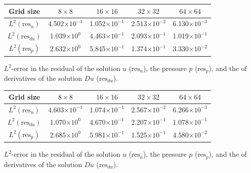 \documentclass[usenames,dvipsnames,letterpaper,landscape,final]{slides}
\theoremstyle{definition}
\begin{document}
\begin{myslide}

\begin{center}
     \begin{tabular}{c | c c c c}
     Grid size & $8\times8$ & $16\times 16$ & $32\times32$ & $64 \times 64$ \\
     \hline
     $L^2(\text{res}_u)$ & 4.502$\times10^{-1}$ & 1.052$\times10^{-1}$ & 2.513$\times10^{-2}$ & 6.130$\times10^{-3}$ \\
				 $L^2(\text{res}_{du})$ & 1.039$\times10^0$ & 4.463$\times10^{-1}$ & 2.093$\times10^{-1}$ & 1.019$\times10^{-1}$ \\
     $L^2(\text{res}_{p})$ & 2.632$\times10^0$ & 5.845$\times10^{-1}$ & 1.374$\times10^{-1}$ & 3.330$\times10^{-2}$ \\
    \end{tabular}
\end{center}

     $L^2$-error in the residual of the solution $u$ ($\text{res}_u$), the pressure $p$ ($\text{res}_p$), and the of derivatives of the solution $Du$ ($\text{res}_{du}$).

\vspace{0.8cm}
\begin{center}
    \begin{tabular}{c | c c c c}
     Grid size & $8\times8$ & $16\times 16$ & $32\times32$ & $64 \times 64$ \\
     \hline
     $L^2(\text{res}_u)$ & 4.603$\times10^{-1}$ & 1.074$\times10^{-1}$ & 2.567$\times10^{-2}$ & 6.266$\times10^{-3}$ \\
				$L^2(\text{res}_{du})$ & 1.070$\times10^0$ & 4.670$\times10^{-1}$ & 2.207$\times10^{-1}$ & 1.078$\times10^{-1}$ \\
				$L^2(\text{res}_{p})$ & 2.685$\times10^0$ & 5.981$\times10^{-1}$ & 1.525$\times10^{-1}$ & 4.580$\times10^{-2}$ \\
    \end{tabular}
	 \end{center}
     $L^2$-error in the residual of the solution $u$ ($\text{res}_u$), the pressure $p$ ($\text{res}_p$), and the of derivatives of the solution $Du$ ($\text{res}_{du}$).


\end{myslide}
\end{document}
